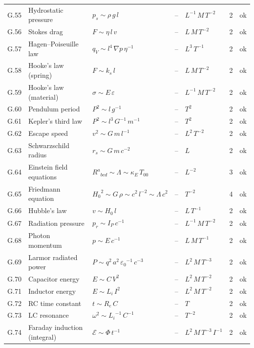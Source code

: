 {\begin{longtable}{@{}l>{\raggedright\arraybackslash}p{3.0cm}>{\raggedright\arraybackslash}p{5.6cm}>{\raggedright\arraybackslash}p{2.0cm}>{\raggedright\arraybackslash}p{2.3cm}rl@{}}
G.55 & Hydrostatic pressure & $p_s \sim \rho\,g\,l$ & -- & $L^{-1}\,M\,T^{-2}$ & 2 & ok \\
G.56 & Stokes drag & $F \sim \eta\,l\,v$ & -- & $L\,M\,T^{-2}$ & 2 & ok \\
G.57 & Hagen--Poiseuille law & $q_V \sim {l}^{4}\,\nabla p\,{\eta}^{-1}$ & -- & $L^{3}\,T^{-1}$ & 2 & ok \\
G.58 & Hooke's law (spring) & $F \sim k_s\,l$ & -- & $L\,M\,T^{-2}$ & 2 & ok \\
G.59 & Hooke's law (material) & $\sigma \sim E\,\varepsilon$ & -- & $L^{-1}\,M\,T^{-2}$ & 2 & ok \\
G.60 & Pendulum period & ${P}^{2} \sim l\,{g}^{-1}$ & -- & $T^{2}$ & 2 & ok \\
G.61 & Kepler's third law & ${P}^{2} \sim {l}^{3}\,{G}^{-1}\,{m}^{-1}$ & -- & $T^{2}$ & 2 & ok \\
G.62 & Escape speed & ${v}^{2} \sim G\,m\,{l}^{-1}$ & -- & $L^{2}\,T^{-2}$ & 2 & ok \\
G.63 & Schwarzschild radius & $r_s \sim G\,m\,{c}^{-2}$ & -- & $L$ & 2 & ok \\
G.64 & Einstein field equations & $R^a{}_{bcd} \sim \Lambda \sim \kappa_E\,T_{00}$ & -- & $L^{-2}$ & 3 & ok \\
G.65 & Friedmann equation & ${H_0}^{2} \sim G\,\rho \sim {c}^{2}\,{l}^{-2} \sim \Lambda\,{c}^{2}$ & -- & $T^{-2}$ & 4 & ok \\
G.66 & Hubble's law & $v \sim H_0\,l$ & -- & $L\,T^{-1}$ & 2 & ok \\
G.67 & Radiation pressure & $p_r \sim I_P\,{c}^{-1}$ & -- & $L^{-1}\,M\,T^{-2}$ & 2 & ok \\
G.68 & Photon momentum & $p \sim E\,{c}^{-1}$ & -- & $L\,M\,T^{-1}$ & 2 & ok \\
G.69 & Larmor radiated power & $P \sim {q}^{2}\,{a}^{2}\,{\varepsilon_0}^{-1}\,{c}^{-3}$ & -- & $L^{2}\,M\,T^{-3}$ & 2 & ok \\
G.70 & Capacitor energy & $E \sim C\,{V}^{2}$ & -- & $L^{2}\,M\,T^{-2}$ & 2 & ok \\
G.71 & Inductor energy & $E \sim L_i\,{I}^{2}$ & -- & $L^{2}\,M\,T^{-2}$ & 2 & ok \\
G.72 & RC time constant & $t \sim R_e\,C$ & -- & $T$ & 2 & ok \\
G.73 & LC resonance & ${\omega}^{2} \sim {L_i}^{-1}\,{C}^{-1}$ & -- & $T^{-2}$ & 2 & ok \\
G.74 & Faraday induction (integral) & $\mathcal{E} \sim \Phi\,{t}^{-1}$ & -- & $L^{2}\,M\,T^{-3}\,I^{-1}$ & 2 & ok \\

\end{longtable}}
